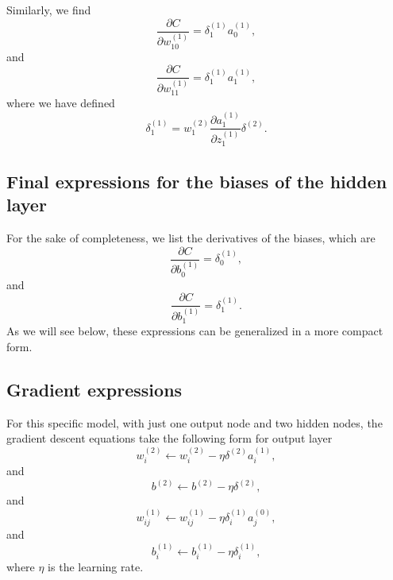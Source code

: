\documentclass[%
oneside,                 %
final,                   %
10pt]{article}
\begin{document}
Similarly, we find
\[
\frac{\partial C}{\partial w_{10}^{(1)}}=\delta_1^{(1)}a_0^{(1)},
\]
and 
\[
\frac{\partial C}{\partial w_{11}^{(1)}}=\delta_1^{(1)}a_1^{(1)},
\]
where we have defined 
\[
\delta_1^{(1)}=w_1^{(2)}\frac{\partial a_1^{(1)}}{\partial z_1^{(1)}}\delta^{(2)}.
\]

\subsection{Final expressions for the biases of the hidden layer}

For the sake of completeness, we list the derivatives of the biases, which are
\[
\frac{\partial C}{\partial b_{0}^{(1)}}=\delta_0^{(1)},
\]
and
\[
\frac{\partial C}{\partial b_{1}^{(1)}}=\delta_1^{(1)}.
\]
As we will see below, these expressions can be generalized in a more compact form. 

\subsection{Gradient expressions}

For this specific model, with just one output node and two hidden
nodes, the gradient descent equations take the following form for output layer
\[
w_{i}^{(2)}\leftarrow w_{i}^{(2)}- \eta \delta^{(2)} a_{i}^{(1)},
\]
and
\[
b^{(2)} \leftarrow b^{(2)}-\eta \delta^{(2)},
\]
and
\[
w_{ij}^{(1)}\leftarrow w_{ij}^{(1)}- \eta \delta_{i}^{(1)} a_{j}^{(0)},
\]
and
\[
b_{i}^{(1)} \leftarrow b_{i}^{(1)}-\eta \delta_{i}^{(1)},
\]
where $\eta$ is the learning rate.

\end{document}
